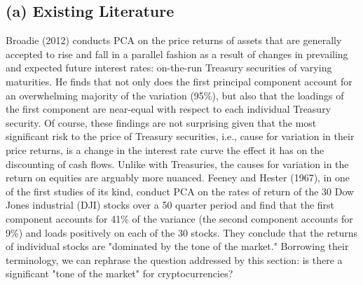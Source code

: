 \documentclass[12pt,twoside]{article}
\begin{document}
\subsection*{(a) Existing Literature}
Broadie (2012) conducts PCA on the price returns of assets that are generally accepted to rise and fall in a parallel fashion as a result of changes in prevailing and expected future interest rates: on-the-run Treasury securities of varying maturities. He finds that not only does the first principal component account for an overwhelming majority of the variation (95\%), but also that the loadings of the first component are near-equal with respect to each individual Treasury security. Of course, these findings are not surprising given that the most significant risk to the price of Treasury securities, i.e., cause for variation in their price returns, is a change in the interest rate curve the effect it has on the discounting of cash flows. Unlike with Treasuries, the causes for variation in the return on equities are arguably more nuanced. Feeney and Hester (1967), in one of the first studies of its kind, conduct PCA on the rates of return of the 30 Dow Jones industrial (DJI) stocks over a 50 quarter period and find that the first component accounts for 41\% of the variance (the second component accounts for 9\%) and loads positively on each of the 30 stocks. They conclude that the returns of individual stocks are "dominated by the tone of the market." Borrowing their terminology, we can rephrase the question addressed by this section: is there a significant "tone of the market" for cryptocurrencies?
\end{document}
